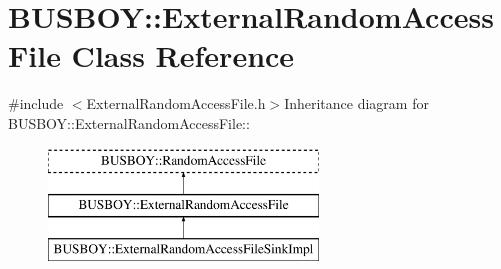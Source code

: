 \hypertarget{classBUSBOY_1_1ExternalRandomAccessFile}{
\section{BUSBOY::ExternalRandomAccessFile Class Reference}
\label{classBUSBOY_1_1ExternalRandomAccessFile}
}


{\ttfamily \#include $<$ExternalRandomAccessFile.h$>$}Inheritance diagram for BUSBOY::ExternalRandomAccessFile::\begin{figure}[H]
\begin{center}
\leavevmode
\includegraphics[height=3cm]{classBUSBOY_1_1ExternalRandomAccessFile}
\end{center}
\end{figure}

